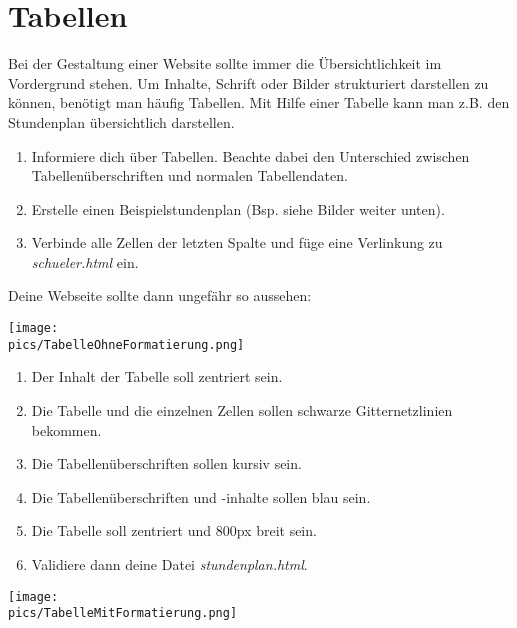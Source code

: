 \section{Tabellen}
Bei der Gestaltung einer Website sollte immer die Übersichtlichkeit im Vordergrund stehen. Um Inhalte, Schrift oder Bilder strukturiert darstellen zu können, benötigt man häufig Tabellen. Mit Hilfe einer Tabelle kann man z.B. den Stundenplan übersichtlich darstellen.

\begin{Exercise}[title=Erstelle deinen Stundenplan in \textit{stundenplan.html}, label=Tabellen1]
    \begin{enumerate}
        \item Informiere dich über Tabellen. Beachte dabei den Unterschied zwischen Tabellenüberschriften und normalen Tabellendaten.
        \item Erstelle einen Beispielstundenplan (Bsp. siehe Bilder weiter unten).
        \item Verbinde alle Zellen der letzten Spalte und füge eine Verlinkung zu \textit{schueler.html} ein.
    \end{enumerate}
\end{Exercise}
Deine Webseite sollte dann ungefähr so aussehen:

\begin{minipage}[t]{\textwidth}
    \texttt{[image: \\pics/TabelleOhneFormatierung.png]}
\end{minipage}%

\begin{Exercise}[title=Formatiere deine Tabelle mit Hilfe von CSS, label=Tabellen2]
    \begin{enumerate}
        \item Der Inhalt der Tabelle soll zentriert sein.
        \item Die Tabelle und die einzelnen Zellen sollen schwarze Gitternetzlinien bekommen.
        \item Die Tabellenüberschriften sollen kursiv sein.
        \item Die Tabellenüberschriften und -inhalte sollen blau sein.
        \item Die Tabelle soll zentriert und 800px breit sein.
        \item Validiere dann deine Datei \textit{stundenplan.html}.
    \end{enumerate}
\end{Exercise}

\begin{minipage}[t]{\textwidth}
    \texttt{[image: \\pics/TabelleMitFormatierung.png]}
\end{minipage}%
